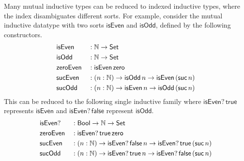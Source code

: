 \documentclass[a4paper,UKenglish,cleveref, autoref]{lipics-v2019}
\begin{document}
Many mutual inductive types can be reduced to indexed inductive types, where the
index disambiguates different sorts. For example, consider the mutual inductive datatype
with two sorts
$\mathsf{isEven}$ and $\mathsf{isOdd}$, defined by the following
constructors.
\begin{alignat*}{5}
  & \mathsf{isEven} && : \mathbb{N}\rightarrow\mathsf{Set} \\
  & \mathsf{isOdd} && : \mathbb{N}\rightarrow \mathsf{Set} \\
  & \mathsf{zeroEven} && : \mathsf{isEven}\,\mathsf{zero} \\
  & \mathsf{sucEven} && : (n:\mathbb{N})\rightarrow\mathsf{isOdd}\,n\rightarrow\mathsf{isEven}\,(\mathsf{suc}\,n) \\
  & \mathsf{sucOdd} && : (n:\mathbb{N})\rightarrow\mathsf{isEven}\,n\rightarrow\mathsf{isOdd}\,(\mathsf{suc}\,n)
\end{alignat*}
This can be reduced to the following single inductive family where
$\mathsf{isEven?}\,\mathsf{true}$ represents $\mathsf{isEven}$ and
$\mathsf{isEven?}\,\mathsf{false}$ represent $\mathsf{isOdd}$.
\begin{alignat*}{5}
  & \mathsf{isEven?} && : \mathsf{Bool}\rightarrow\mathbb{N}\rightarrow\mathsf{Set} \\
  & \mathsf{zeroEven} && : \mathsf{isEven?}\,\mathsf{true}\,\mathsf{zero} \\
  & \mathsf{sucEven} && : (n:\mathbb{N})\rightarrow\mathsf{isEven?}\,\mathsf{false}\,n\rightarrow\mathsf{isEven?}\,\mathsf{true}\,(\mathsf{suc}\,n) \\
  & \mathsf{sucOdd} && : (n:\mathbb{N})\rightarrow\mathsf{isEven?}\,\mathsf{true}\,n\rightarrow\mathsf{isEven?}\,\mathsf{false}\,(\mathsf{suc}\,n)
\end{alignat*}
\end{document}
